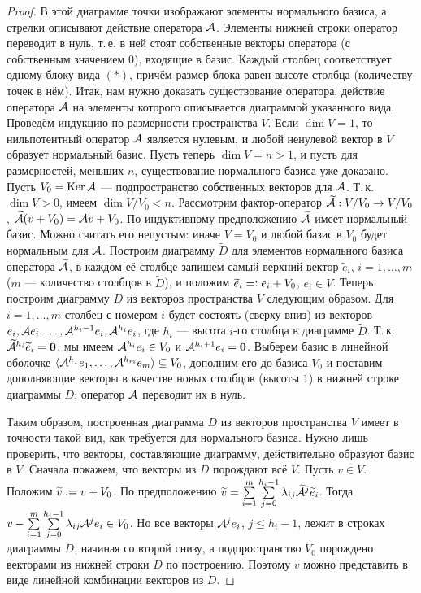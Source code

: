 \begin{proof}
    В этой диаграмме точки изображают элементы нормального базиса, а стрелки описывают действие оператора $\mathcal{A}$. Элементы нижней строки оператор переводит в нуль, т.\,е. в ней стоят собственные векторы оператора (с собственным значением $0$), входящие в базис. Каждый столбец соответствует одному блоку вида $(\ast)$, причём размер блока равен высоте столбца (количеству точек в нём). Итак, нам нужно доказать существование оператора, действие оператора $\mathcal{A}$ на элементы которого описывается диаграммой указанного вида. Проведём индукцию по размерности пространства $V$. Если $\dim V = 1$, то нильпотентный оператор $\mathcal{A}$ является нулевым, и любой ненулевой вектор в $V$ образует нормальный базис. Пусть теперь $\dim V = n > 1$, и пусть для размерностей, меньших $n$, существование нормального базиса уже доказано. Пусть $V_0 = \operatorname{Ker}\mathcal{A}$ --- подпространство собственных векторов для $\mathcal{A}$. Т.\,к. $\dim V > 0$, имеем $\dim V / V_0 < n$. Рассмотрим фактор-оператор $\widetilde{\mathcal{A}}: V / V_0 \to V / V_0$, $\widetilde{\mathcal{A}}(v + V_0) = \mathcal{A} v + V_0$. По индуктивному предположению $\widetilde{\mathcal{A}}$ имеет нормальный базис. Можно считать его непустым: иначе $V = V_0$ и любой базис в $V_0$ будет нормальным для $\mathcal{A}$. Построим диаграмму $\widetilde{D}$ для элементов нормального базиса оператора $\widetilde{\mathcal{A}}$, в каждом её столбце запишем самый верхний вектор $\widetilde{e}_i$, $i = 1, \ldots, m$ ($m$ --- количество столбцов в $\widetilde{D}$), и положим $\widetilde{e}_i = \vcentcolon e_i + V_0$, $e_i \in V$. Теперь построим диаграмму $D$ из векторов пространства $V$ следующим образом. Для $i = 1, \ldots, m$ столбец с номером $i$ будет состоять (сверху вниз) из векторов $e_i, \mathcal{A} e_i, \ldots, \mathcal{A}^{h_i - 1}e_i, \mathcal{A}^{h_i}e_i$, где $h_i$ --- высота $i$-го столбца в диаграмме $\widetilde{D}$. Т.\,к. $\widetilde{\mathcal{A}}^{h_i}\widetilde{e}_i = \boldsymbol{0}$, мы имеем $\mathcal{A}^{h_i}e_i \in V_0$ и $\mathcal{A}^{h_i + 1}e_i = \boldsymbol{0}$. Выберем базис в линейной оболочке $\langle \mathcal{A}^{h_1}e_1, \ldots, \mathcal{A}^{h_m}e_m \rangle \subseteq V_0$, дополним его до базиса $V_0$ и поставим дополняющие векторы в качестве новых столбцов (высоты $1$) в нижней строке диаграммы $D$; оператор $\mathcal{A}$ переводит их в нуль.

    Таким образом, построенная диаграмма $D$ из векторов пространства $V$ имеет в точности такой вид, как требуется для нормального базиса. Нужно лишь проверить, что векторы, составляющие диаграмму, действительно образуют базис в $V$. Сначала покажем, что векторы из $D$ порождают всё $V$. Пусть $v \in V$. Положим $\widetilde{v} \vcentcolon = v + V_0$. По предположению $\widetilde{v} = \sum\limits_{i = 1}^m\sum\limits_{j = 0}^{h_i - 1}\lambda_{ij}\widetilde{\mathcal{A}}^j\widetilde{e}_i$. Тогда $v - \sum\limits_{i = 1}^m\sum\limits_{j = 0}^{h_i - 1}\lambda_{ij}\mathcal{A}^je_i \in V_0$. Но все векторы $\mathcal{A}^je_i$, $j \leqslant h_i - 1$, лежит в строках диаграммы $D$, начиная со второй снизу, а подпространство $V_0$ порождено векторами из нижней строки $D$ по построению. Поэтому $v$ можно представить в виде линейной комбинации векторов из $D$.


\end{proof}
